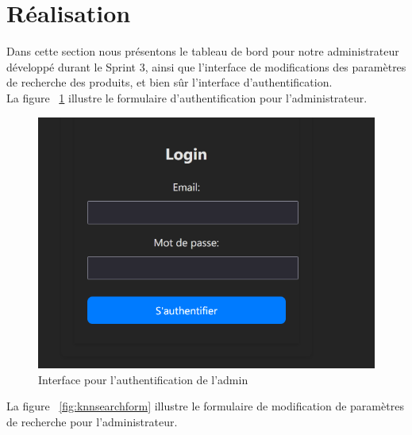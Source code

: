 \section{Réalisation}
\noindent
Dans cette section nous présentons le tableau de bord pour notre administrateur développé durant le Sprint 3, ainsi que l'interface de modifications des paramètres de recherche des produits, et bien sûr l'interface d'authentification. \\

\newpage
\noindent
La figure ~\ref{fig:signin} illustre le formulaire d'authentification pour l'administrateur.

\begin{figure}[H]
    \centering
    \includegraphics[width=1\textwidth]{logos/login.png}
    \caption{Interface pour l'authentification de l'admin}
    \label{fig:signin}
\end{figure}

\noindent
La figure ~\ref{fig:knnsearchform} illustre le formulaire de modification de paramètres de recherche pour l'administrateur.

